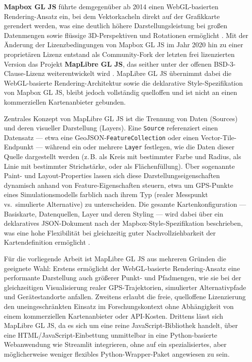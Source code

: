 \documentclass[12pt,a4paper]{report}
\begin{document}
\textbf{Mapbox GL JS} führte demgegenüber ab 2014 einen WebGL-basierten Rendering-Ansatz ein, bei dem Vektorkacheln direkt auf der Grafikkarte gerendert werden, was eine deutlich höhere Darstellungsleistung bei großen Datenmengen sowie flüssige 3D-Perspektiven und Rotationen ermöglicht \cite{TODO:MapboxGL}. Mit der Änderung der Lizenzbedingungen von Mapbox GL JS im Jahr 2020 hin zu einer proprietären Lizenz entstand als Community-Fork der letzten frei lizenzierten Version das Projekt \textbf{MapLibre GL JS}, das seither unter der offenen BSD-3-Clause-Lizenz weiterentwickelt wird \cite{TODO:MapLibreGH}. MapLibre GL JS übernimmt dabei die WebGL-basierte Rendering-Architektur sowie die deklarative Style-Spezifikation von Mapbox GL JS, bleibt jedoch vollständig quelloffen und ist nicht an einen kommerziellen Kartenanbieter gebunden.

Zentrales Konzept von MapLibre GL JS ist die Trennung von Daten (Sources) und deren visueller Darstellung (Layers). Eine \texttt{Source} referenziert einen Datensatz — etwa eine GeoJSON-\texttt{FeatureCollection} oder einen Vector-Tile-Endpunkt — während ein oder mehrere \texttt{Layer} festlegen, wie die Daten dieser Quelle dargestellt werden (z.\,B. als Kreis mit bestimmter Farbe und Radius, als Linie mit bestimmter Strichstärke, oder als Flächenfüllung). Über sogenannte Paint- und Layout-Properties lassen sich diese Darstellungseigenschaften dynamisch anhand von Feature-Eigenschaften steuern, etwa um GPS-Punkte eines Simulationsmodells farblich nach ihrem Typ (realer Messpunkt vs.\ simulierte Alternative) zu unterscheiden. Die gesamte Kartenkonfiguration — Basiskarte, Datenquellen, Layer und deren Styling — wird dabei über ein deklaratives JSON-Dokument nach der Mapbox-Style-Spezifikation beschrieben, was eine hohe Flexibilität bei gleichzeitig guter Nachvollziehbarkeit der Kartendefinition ermöglicht \cite{TODO:StyleSpec}.

Für die vorliegende Arbeit ist MapLibre GL JS aus mehreren Gründen die geeignete Wahl: Erstens ermöglicht der WebGL-basierte Rendering-Ansatz eine performante Darstellung auch größerer Punkt- und Pfadmengen, wie sie bei der gleichzeitigen Visualisierung realer GPS-Trajektorien, simulierter Alternativpfade und Gerätestandorte anfallen. Zweitens erlaubt die freie, quelloffene Lizenzierung den uneingeschränkten Einsatz im Forschungskontext ohne Abhängigkeit von einem kommerziellen Kartenanbieter oder API-Kosten. Drittens lässt sich MapLibre GL JS, da es sich um eine reine JavaScript-Bibliothek handelt, über eine HTML/JavaScript-Einbettung unmittelbar in eine Python-basierte Webanwendung wie Streamlit integrieren, ohne auf ein spezialisiertes, aber möglicherweise weniger flexibles Python-Wrapper-Paket angewiesen zu sein.
\end{document}
